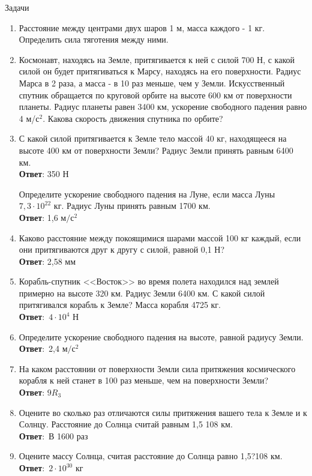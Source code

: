 \documentclass[a6paper, 11pt]{diss_4}
\renewcommand{\'}{\,'}
\begin{document}
\begin{center}
   Задачи
\end{center}
\begin{enumerate}

  \item Расстояние между центрами двух шаров 1 м, масса каждого - 1 кг.
Определить сила тяготения между ними.

  \item Космонавт, находясь на Земле, притягивается к ней с силой 700 Н, с какой
 силой он будет притягиваться к Марсу, находясь на его поверхности. Радиус
Марса в 2 раза, а масса - в 10 раз меньше, чем у Земли. Искусственный спутник
 обращается по круговой орбите на высоте 600 км от поверхности планеты. Радиус
 планеты равен 3400 км, ускорение свободного падения равно 4 м/$с^2$. Какова
скорость движения спутника по орбите?

  \item С какой силой притягивается к Земле тело массой 40 кг, находящееся на
высоте 400 км от поверхности Земли? Радиус Земли принять равным 6400 км.
\\\textbf{Ответ}: 350 Н

  Определите ускорение свободного падения на Луне, если масса Луны
$7,3\cdot10^{22}$ кг. Радиус Луны принять равным 1700 км.\\\textbf{Ответ}: 1,6
$м/с^2$

  \item Каково расстояние между покоящимися шарами массой 100 кг каждый, если
они притягиваются друг к другу с силой, равной 0,1 Н?\\\textbf{Ответ}: 2,58 мм

  \item Корабль-спутник <<Восток>> во время полета находился над землей примерно
на высоте 320 км. Радиус Земли 6400 км. С какой силой притягивался корабль к
 Земле? Масса корабля 4725 кг.\\\textbf{Ответ}:\ $4\cdot10^4$ Н

  \item Определите ускорение свободного падения на высоте, равной радиусу Земли.
 \\\textbf{Ответ}:\ 2,4 $м/с^2$

  \item На каком расстоянии от поверхности Земли сила притяжения космического
корабля к ней станет в 100 раз меньше, чем на поверхности
Земли?\\\textbf{Ответ}: $9R_3$

  \item Оцените во сколько раз отличаются силы притяжения вашего тела к Земле и
к Солнцу. Расстояние до Солнца считай равным 1,5 108 км.\\\textbf{Ответ}:\ В
1600 раз

  \item Оцените массу Солнца, считая расстояние до Солнца равно 1,5?108 км.
\\\textbf{Ответ}:\ $2\cdot10^{30}$ кг

\end{enumerate}
\end{document}
